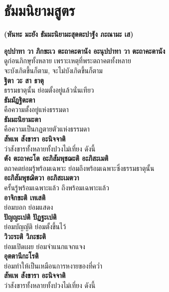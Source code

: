 \documentclass[12pt]{article}
\begin{document}
\pagebreak
\section{ธัมมนิยามสูตร}
\begin{center}
\textbf{(หันทะ มะยัง ธัมมะนิยามะสุตตะปาฐัง ภะณามะ เส)}
\end{center}
\textbf{อุปปาทา วา ภิกขะเว ตะถาคะตานัง อะนุปปาทา วา ตะถาคะตานัง}\\
\indent ดูก่อนภิกษุทั้งหลาย เพราะเหตุที่พระตถาคตทั้งหลาย \\
\indent จะบังเกิดขึ้นก็ตาม, จะไม่บังเกิดขึ้นก็ตาม\\
\textbf{ฐิตา วะ สา ธาตุ}\\
\indent ธรรมธาตุนั้น ย่อมตั้งอยู่แล้วนั่นเทียว\\
\textbf{ธัมมัฏฐิตะตา}\\
\indent คือความตั้งอยู่แห่งธรรมดา\\
\textbf{ธัมมะนิยามะตา}\\
\indent คือความเป็นกฏตายตัวแห่งธรรมดา\\
\textbf{สัพเพ สังขารา อะนิจจาติ}\\
\indent ว่าสังขารทั้งหลายทั้งปวงไม่เที่ยง ดังนี้\\
\textbf{ตัง ตะถาคะโต อะภิสัมพุชฌะติ อะภิสะเมติ}\\
\indent ตถาคตย่อมรู้พร้อมเฉพาะ ย่อมถึงพร้อมเฉพาะซึ่งธรรมธาตุนั้น\\
\textbf{อะภิสัมพุชฌิตวา อะภิสะเมตวา}\\
\indent ครั้นรู้พร้อมเฉพาะแล้ว ถึงพร้อมเฉพาะแล้ว\\
\textbf{อาจิกขะติ เทเสติ}\\
\indent ย่อมบอก ย่อมแสดง\\
\textbf{ปัญญะเปติ ปัฏฐะเปติ}\\
\indent ย่อมบัญญัติ ย่อมตั้งขึ้นไว้\\
\textbf{วิวะระติ วิภะชะติ}\\
\indent ย่อมเปิดเผย ย่อมจำแนกแจกแจง\\
\textbf{อุตตานีกะโรติ}\\
\indent ย่อมทำให้เป็นเหมือนการหงายของที่คว่ำ\\
\textbf{สัพเพ สังขารา อะนิจจาติ}\\
\indent ว่าสังขารทั้งหลายทั้งปวงไม่เที่ยง ดังนี้\\

\pagebreak
\end{document}
